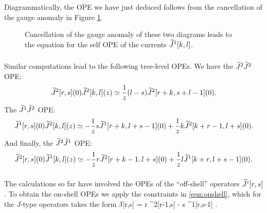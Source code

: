 \documentclass[../main.tex]{subfiles}
\begin{document}
Diagrammatically, the OPE we have just deduced follows from the cancellation of the gauge anomaly in Figure \ref{fig:JJcancel}.


\begin{figure}
	\caption{Cancellation of the gauge anomaly of these two diagrams leads to the equation for the self OPE of the currents $\widetilde{J}^1[k,l]$. \label{fig:JJcancel}}
\end{figure}

\subsubsection{}

Similar computations lead to the following tree-level OPEs.
We have the $\widetilde{J}^2 \widetilde{J}^2$ OPE:
\[ 
		\widetilde{J}^2[r,s](0)  \widetilde{J}^2[k,l](z)
	\simeq \frac{1}{z} (l-s)  \widetilde{J}^2 [r+k,s+l-1] (0) . 
\]
The $\widetilde{J}^1 \widetilde{J}^2$ OPE:
\[ 
	\widetilde{J}^1[r,s] (0) \widetilde{J}^2[k,l](z) \simeq - \frac{1}{z} s  \widetilde{J}^1[r+k, l+s - 1] (0) + \frac{1}{z} k \widetilde{J}^2[k+r-1,l+s] (0).
\]
And finally, the $\widetilde{J}^2 \widetilde{J}^1$ OPE:
\[ 
	\widetilde{J}^2[r,s] (0) \widetilde{J}^1[k,l](z) \simeq - \frac{1}{z} r  \widetilde{J}^2[r+k-1, l+s ] (0)    + \frac{1}{z} l \widetilde{J}^1[k+r,l+s-1] (0).   
\]

\subsubsection{}

The calculations so far have involved the OPEs of the ``off-shell'' operators $\widetilde{J}^i[r,s]$.
To obtain the on-shell OPEs we apply the constraints in \eqref{eqn:onshell}, which for the $J$-type operators takes the form
\beqn\label{eqn:Jonshell}
	 	J[r,s] = r ^2[r-1,s] - s ^1[r,s-1] .
\eeqn
\end{document}
